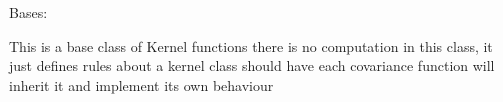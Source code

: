 \documentclass[letterpaper,10pt,english]{sphinxmanual}
\begin{document}

\begin{fulllineitems}
\label{pyGPs.Core:pyGPs.Core.cov.Kernel}
Bases: 

This is a base class of Kernel functions
there is no computation in this class, it just defines rules about a kernel class should have
each covariance function will inherit it and implement its own behaviour

\begin{fulllineitems}
\label{pyGPs.Core:pyGPs.Core.cov.Kernel.fitc}
\end{fulllineitems}


\begin{fulllineitems}
\label{pyGPs.Core:pyGPs.Core.cov.Kernel.sq_dist}
\end{fulllineitems}


\end{fulllineitems}

\end{document}
